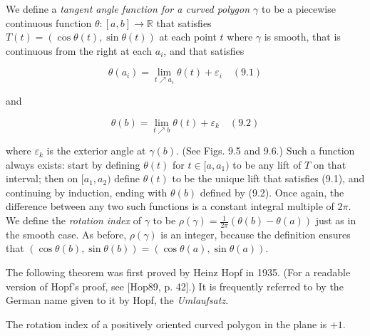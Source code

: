 We define a \emph{tangent angle function for a curved polygon $\gamma$} to be a piecewise continuous function $\theta : [a,b] \to \mathbb{R}$ that satisfies $T(t) = (\cos\theta(t), \sin\theta(t))$ at each point $t$ where $\gamma$ is smooth, that is continuous from the right at each $a_i$, and that satisfies

\[\theta(a_i) = \lim_{t \nearrow a_i} \theta(t) + \varepsilon_i \quad (9.1)\]

and

\[\theta(b) = \lim_{t \nearrow b} \theta(t) + \varepsilon_k \quad (9.2)\]

where $\varepsilon_k$ is the exterior angle at $\gamma(b)$. (See Figs. 9.5 and 9.6.) Such a function always exists: start by defining $\theta(t)$ for $t \in [a, a_1)$ to be any lift of $T$ on that interval; then on $[a_1, a_2)$ define $\theta(t)$ to be the unique lift that satisfies (9.1), and continuing by induction, ending with $\theta(b)$ defined by (9.2). Once again, the difference between any two such functions is a constant integral multiple of $2\pi$. We define the \emph{rotation index} of $\gamma$ to be $\rho(\gamma) = \frac{1}{2\pi}(\theta(b) - \theta(a))$ just as in the smooth case. As before, $\rho(\gamma)$ is an integer, because the definition ensures that $(\cos \theta(b), \sin \theta(b)) = (\cos \theta(a), \sin \theta(a))$.


The following theorem was first proved by Heinz Hopf in 1935. (For a readable version of Hopf's proof, see [Hop89, p. 42].) It is frequently referred to by the German name given to it by Hopf, the \emph{Umlaufsatz}.

\begin{theorem}
\label{thm:rotation-index-theorem}
The rotation index of a positively oriented curved polygon in the plane is $+1$.
\end{theorem}


